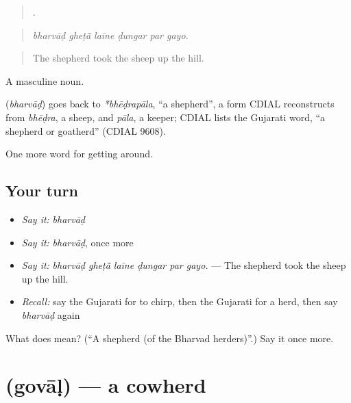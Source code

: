 \begin{quote}
     .
\end{quote}

\begin{quote}
\emph{bharvāḍ gheṭā̃ laīne ḍungar par gayo.}
\end{quote}

\begin{quote}
The shepherd took the sheep up the hill.
\end{quote}

A masculine noun.

\begin{cousinweb}
\textbf{} (\emph{bharvāḍ}) goes back to \emph{*bhēḍrapāla}, \textquotedblleft{}a shepherd\textquotedblright{}, a form CDIAL reconstructs from \emph{bhēḍra}, a sheep, and \emph{pāla}, a keeper; CDIAL lists the Gujarati word, \textquotedblleft{}a shepherd or goatherd\textquotedblright{} (CDIAL 9608).
\end{cousinweb}

\begin{grammarlens}[title={What you've built}]
One more word for getting around.
\end{grammarlens}

\subsection*{Your turn}
\begin{itemize}
\raggedright
  \item \emph{Say it:} \emph{bharvāḍ}
  \item \emph{Say it:} \emph{bharvāḍ}, once more
  \item \emph{Say it:} \emph{bharvāḍ gheṭā̃ laīne ḍungar par gayo.} — The shepherd took the sheep up the hill.
  \item \emph{Recall:} say the Gujarati for to chirp, then the Gujarati for a herd, then say \emph{bharvāḍ} again
\end{itemize}

\begin{tcolorbox}[breakable,colback=teal!4,colframe=teal!35!black,title={Before you move on}]
What does  mean? (\textquotedblleft{}A shepherd (of the Bharvad herders)\textquotedblright{}.) Say it once more.
\end{tcolorbox}
\section[\texorpdfstring{\gu{ગોવાળ} (govāḷ)}{ગોવાળ (govāḷ)}]{ (govāḷ) — a cowherd}


